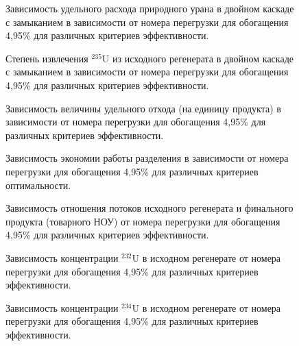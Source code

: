 \begin{figure}[ht]
    \centering
    \begin{minipage}{.5\textwidth}
      \centering
      
      \caption{{Зависимость удельного расхода природного урана в двойном каскаде с замыканием в зависимости от номера перегрузки для обогащения 4,95\% для различных критериев эффективности.{\label{3}}}}
    \end{minipage}%
    \begin{minipage}{.5\textwidth}
      \centering
      
\caption{{Степень извлечения $^{235}$U из исходного регенерата в двойном каскаде с замыканием в зависимости от номера перегрузки для обогащения 4,95\% для различных критериев эффективности.{\label{4}}}}
\end{minipage}
\end{figure}



\begin{figure}[ht]
    \centering
    \begin{minipage}{.5\textwidth}
      \centering
      
      \caption{{Зависимость величины удельного отхода (на единицу продукта) в зависимости от номера перегрузки для обогащения 4,95\% для различных критериев эффективности.{\label{5}}}}
    \end{minipage}%
    \begin{minipage}{.5\textwidth}
      \centering
      
\caption{{Зависимость экономии работы разделения в зависимости от номера перегрузки для обогащения 4,95\% для различных критериев оптимальности.{\label{6}}}}
\end{minipage}
\end{figure}

\begin{figure}[ht]
    \centering
    
    \caption{Зависимость отношения потоков исходного регенерата и финального продукта (товарного НОУ) от номера перегрузки для обогащения 4,95\% для различных критериев эффективности.}\label{7}
\end{figure}



\begin{figure}[ht]
    \centering
    \begin{minipage}{.5\textwidth}
      \centering
      
      \caption{{Зависимость концентрации $^{232}$U в исходном регенерате от номера перегрузки для обогащения 4,95\% для различных критериев эффективности.{\label{8}}}}
    \end{minipage}%
    \begin{minipage}{.5\textwidth}
      \centering
      
\caption{{Зависимость концентрации $^{234}$U в исходном регенерате от номера перегрузки для обогащения 4,95\% для различных критериев эффективности.{\label{9}}}}
\end{minipage}
\end{figure}


